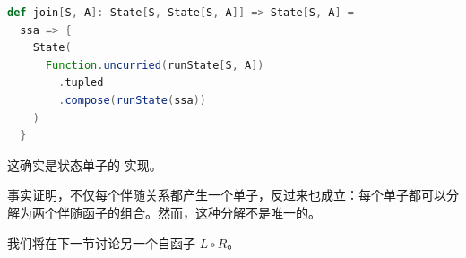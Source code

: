 \begin{lstlisting}[language=Scala]
def join[S, A]: State[S, State[S, A]] => State[S, A] =
  ssa => {
    State(
      Function.uncurried(runState[S, A])
        .tupled
        .compose(runState(ssa))
    )
  }
\end{lstlisting}
这确实是状态单子的  实现。

事实证明，不仅每个伴随关系都产生一个单子，反过来也成立：每个单子都可以分解为两个伴随函子的组合。然而，这种分解不是唯一的。

我们将在下一节讨论另一个自函子 $L \circ R$。
